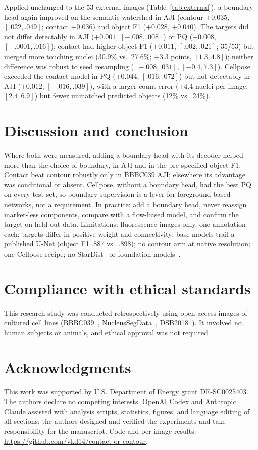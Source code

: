 \documentclass{article}
\begin{document}
Applied unchanged to the 53 external images (Table~\ref{tab:external}), a boundary head again improved on the semantic watershed in AJI (contour $+0.035$, $[.022,.049]$; contact $+0.036$) and object F1 ($+0.028$, $+0.040$). The targets did not differ detectably in AJI ($+0.001$, $[-.008,.008]$) or PQ ($+0.008$, $[-.0001,.016]$); contact had higher object F1 ($+0.011$, $[.002,.021]$; 35/53) but merged more touching nuclei (30.9\% vs.\ 27.6\%; $+3.3$ points, $[1.3,4.8]$); neither difference was robust to seed resampling ($[-.008,.031]$, $[-0.4,7.3]$). Cellpose exceeded the contact model in PQ ($+0.044$, $[.016,.072]$) but not detectably in AJI ($+0.012$, $[-.016,.039]$), with a larger count error ($+4.4$ nuclei per image, $[2.4,6.9]$) but fewer unmatched predicted objects (12\% vs.\ 24\%).

\section{Discussion and conclusion}
Where both were measured, adding a boundary head with its decoder helped more than the choice of boundary, in AJI and in the pre-specified object F1. Contact beat contour robustly only in BBBC039 AJI; elsewhere its advantage was conditional or absent. Cellpose, without a boundary head, had the best PQ on every test set, so boundary supervision is a lever for foreground-based networks, not a requirement. In practice: add a boundary head, never reassign marker-less components, compare with a flow-based model, and confirm the target on held-out data. Limitations: fluorescence images only, one annotation each; targets differ in positive weight and connectivity; base models trail a published U-Net (object F1 .887 vs.\ .898); no contour arm at native resolution; one Cellpose recipe; no StarDist~\cite{schmidt2018stardist} or foundation models~\cite{archit2025microsam,pachitariu2025cellposesam}.

\section{Compliance with ethical standards}
This research study was conducted retrospectively using open-access images of cultured cell lines (BBBC039~\cite{ljosa2012annotated}, NucleusSegData~\cite{gunesli2020attentionboost}, DSB2018~\cite{caicedo2019nucleus}). It involved no human subjects or animals, and ethical approval was not required.

\section{Acknowledgments}
This work was supported by U.S. Department of Energy grant DE-SC0025403. The authors declare no competing interests. OpenAI Codex and Anthropic Claude assisted with analysis scripts, statistics, figures, and language editing of all sections; the authors designed and verified the experiments and take responsibility for the manuscript. Code and per-image results: \url{https://github.com/vkd14/contact-or-contour}.

\let\oldbibitem\bibitem\renewcommand{\bibitem}{\setlength{\itemsep}{0.6pt}\oldbibitem}

{\small}
\end{document}

